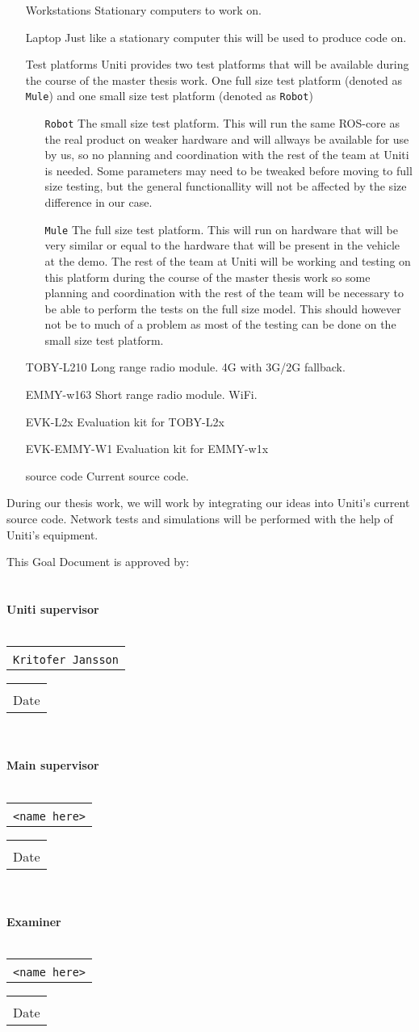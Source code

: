 \documentclass[a4paper]{article}
\makeatletter
\newcommand{\signature}[2]{%
	\noindent%
	\textbf{{#1}}\\\\
	\begin{tabular}{@{}p{2.5in}@{}}
		\\ \hline \\[-.75\normalbaselineskip]
		\texttt{{#2}}
	\end{tabular} \hspace{0in}
	\begin{tabular}{@{}p{2.5in}@{}}
		\\ \hline \\[-.75\normalbaselineskip]
		Date
	\end{tabular}\\
}
\makeatother
\begin{document}
\begin{itemize}
	\item[Workstations] Stationary computers to work on.
	\item[Laptop] Just like a stationary computer this will be used to produce
		code on.
	\item[Test platforms] Uniti provides two test platforms that will be available
		during the course of the master thesis work. One full size test platform
		(denoted as \texttt{Mule}) and one small size test platform (denoted as
		\texttt{Robot})
		\begin{itemize}
			\item[\texttt{Robot}] The small size test platform. This will run the same
				ROS-core as the real product on weaker hardware and will allways be
				available for use by us, so no planning and coordination with the rest
				of the team at Uniti is needed. Some parameters may need to be tweaked
				before moving to full size testing, but the general functionallity will
				not be affected by the size difference in our case.
			\item[\texttt{Mule}] The full size test platform. This will run on
				hardware that will be very similar or equal to the hardware that will be
				present in the vehicle at the demo. The rest of the team at Uniti will
				be working and testing on this platform during the course of the master
				thesis work so some planning and coordination with the rest of the team
				will be necessary to be able to perform the tests on the full size
				model. This should however not be to much of a problem as most of the
				testing can be done on the small size test platform.
		\end{itemize}
	\item[TOBY-L210] Long range radio module. 4G with 3G/2G fallback.
	\item[EMMY-w163] Short range radio module. WiFi.
	\item[EVK-L2x] Evaluation kit for TOBY-L2x
	\item[EVK-EMMY-W1] Evaluation kit for EMMY-w1x
	\item[source code] Current source code.

\end{itemize}

During our thesis work, we will work by integrating our ideas into Uniti's
current source code.
Network tests and simulations will be performed with the help of Uniti's
equipment.



{}


\pagebreak
This Goal Document is approved by:\\\\\\

\signature{Uniti supervisor}{Kritofer Jansson}\\

\signature{Main supervisor}{<name here>}\\

\signature{Examiner}{<name here>}
\end{document}
